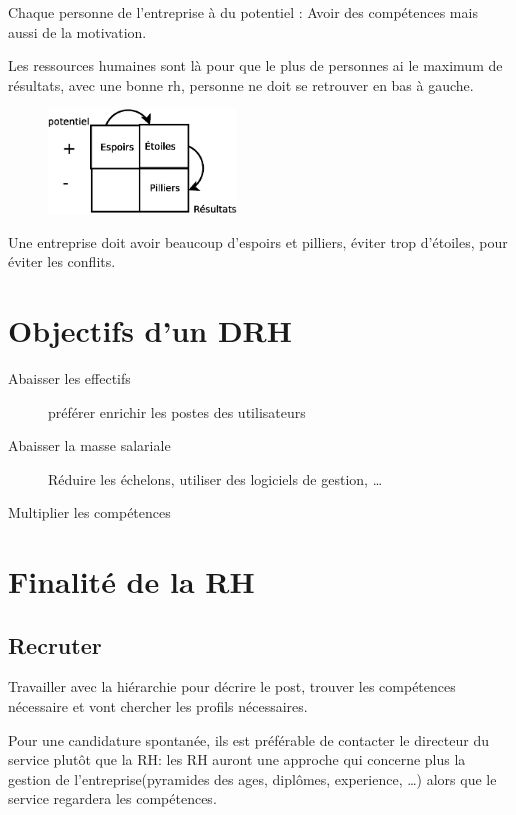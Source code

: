 	Chaque personne de l'entreprise à du potentiel : Avoir des compétences mais aussi de la motivation. 

	Les ressources humaines sont là pour que le plus de personnes ai le maximum de résultats, avec une bonne rh, personne ne doit se retrouver en bas à
	gauche.

	\begin{figure}[H]
		\centering
		\includegraphics[width=5cm]{figure1.eps}
	\end{figure}
	Une entreprise doit avoir beaucoup d'espoirs et pilliers, éviter trop d'étoiles, pour éviter les conflits.

	\section{Objectifs d'un DRH}
	\begin{description}
		\item[Abaisser les effectifs] préférer enrichir les postes des utilisateurs
		\item[Abaisser la masse salariale] Réduire les échelons, utiliser des logiciels de gestion, \ldots
		\item[Multiplier les compétences] 
	\end{description}

	\section{Finalité de la RH}
	\subsection{Recruter}
	Travailler avec la hiérarchie pour décrire le post, trouver les compétences nécessaire et vont chercher les profils nécessaires.
	\begin{remarque}
		Pour une candidature spontanée, ils est préférable de contacter le directeur du service plutôt que la RH: les RH auront une approche qui
		concerne plus la gestion de l'entreprise(pyramides des ages, diplômes, experience, \ldots) alors que le service regardera les compétences.
	\end{remarque}

